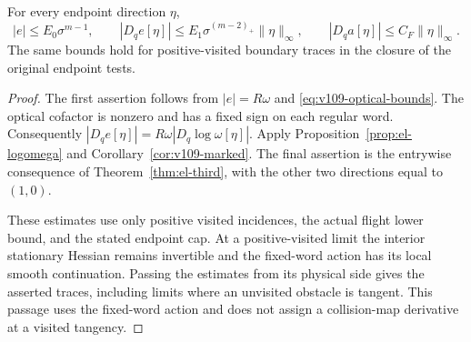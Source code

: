\begin{lemma}
\label{lem:es-mixed}
For every endpoint direction $\eta$,
\begin{equation}\label{eq:es-mixed}
 |e|\le E_0\sigma^{m-1},\qquad
 |D_qe[\eta]|\le E_1\sigma^{(m-2)_+}\|\eta\|_\infty,
 \qquad |D_qa[\eta]|\le C_F\|\eta\|_\infty.
\end{equation}
The same bounds hold for positive-visited boundary traces in the
closure of the original endpoint tests.
\end{lemma}
\begin{proof}
The first assertion follows from $|e|=R\omega$ and
\eqref{eq:v109-optical-bounds}.  The optical cofactor is nonzero
and has a fixed sign on each regular word.  Consequently
$|D_qe[\eta]|=R\omega|D_q\log\omega[\eta]|$.
Apply Proposition~\ref{prop:el-logomega} and
Corollary~\ref{cor:v109-marked}.  The final assertion is the
entrywise consequence of Theorem~\ref{thm:el-third}, with the
other two directions equal to $(1,0)$.

These estimates use only positive visited incidences, the actual
flight lower bound, and the stated endpoint cap.  At a
positive-visited limit the interior stationary Hessian remains
invertible and the fixed-word action has its local smooth
continuation.  Passing the estimates from its physical side gives
the asserted traces, including limits where an unvisited obstacle
is tangent.  This passage uses the fixed-word action and does not
assign a collision-map derivative at a visited tangency.
\end{proof}

